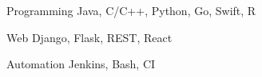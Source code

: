 

\begin{cvskills}

  \cvskill
    {Programming} %
    {Java, C/C++, Python, Go, Swift, R} %

  \cvskill
    {Web} %
    {Django, Flask, REST, React} %
    
  \cvskill
    {Automation}
    {Jenkins, Bash, CI}

\end{cvskills}